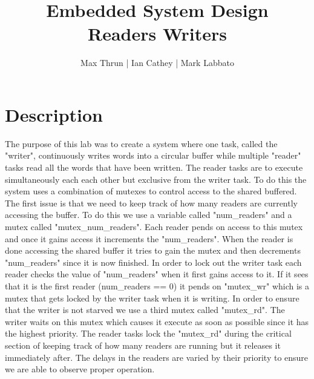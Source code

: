 \documentclass[12pt]{article}
\title{Embedded System Design \\ Readers Writers}
\author{ Max Thrun | Ian Cathey | Mark Labbato }
\begin{document}
\maketitle


\section*{Description}

The purpose of this lab was to create a system where one task, 
called the "writer", continuously writes words into a circular buffer while
multiple "reader" tasks read all the words that have been written. The
reader tasks are to execute simultaneously each each other but exclusive
from the writer task. To do this the system uses a combination of mutexes
to control access to the shared buffered. The first issue is that we need
to keep track of how many readers are currently accessing the buffer. To
do this we use a variable called "num\_readers" and a mutex called
"mutex\_num\_readers". Each reader pends on access to this mutex and once
it gains access it increments the "num\_readers". When the reader is done
accessing the shared buffer it tries to gain the mutex and then decrements
"num\_readers" since it is now finished. In order to lock out the writer
task each reader checks the value of "num\_readers" when it first gains access
to it. If it sees that it is the first reader (num\_readers == 0) it pends on
"mutex\_wr" which is a mutex that gets locked by the writer task when it is
writing. In order to ensure that the writer is not starved we use a third
mutex called "mutex\_rd". The writer waits on this mutex which causes it
execute as soon as possible since it has the highest priority. The reader
tasks lock the "mutex\_rd" during the critical section of keeping track of 
how many readers are running but it releases it immediately after. The delays
in the readers are varied by their priority to ensure we are able to observe
proper operation.
\end{document}
